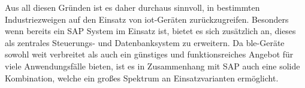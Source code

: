 \noindent Aus all diesen Gründen ist es daher durchaus sinnvoll, in bestimmten Industriezweigen auf den Einsatz von \ac{iot}-Geräten zurückzugreifen. Besonders wenn bereits ein SAP System im Einsatz ist, bietet es sich zusätzlich an, dieses als zentrales Steuerungs- und Datenbanksystem zu erweitern. Da \ac{ble}-Geräte sowohl weit verbreitet als auch ein günstiges und funktionsreiches Angebot für viele Anwendungsfälle bieten, ist es in Zusammenhang mit SAP auch eine solide Kombination, welche ein großes Spektrum an Einsatzvarianten ermöglicht.\\            
  
